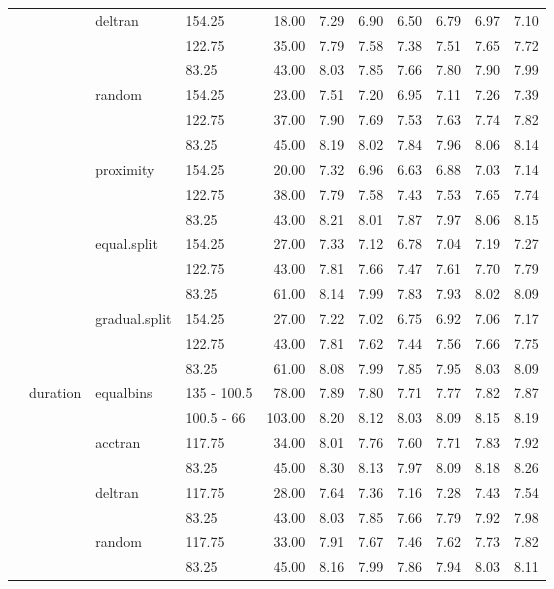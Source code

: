\begin{longtable}{llllrrrrrrr}
   &  & deltran & 154.25 & 18.00 & 7.29 & 6.90 & 6.50 & 6.79 & 6.97 & 7.10 \\ 
   &  &  & 122.75 & 35.00 & 7.79 & 7.58 & 7.38 & 7.51 & 7.65 & 7.72 \\ 
   &  &  & 83.25 & 43.00 & 8.03 & 7.85 & 7.66 & 7.80 & 7.90 & 7.99 \\ 
   &  & random & 154.25 & 23.00 & 7.51 & 7.20 & 6.95 & 7.11 & 7.26 & 7.39 \\ 
   &  &  & 122.75 & 37.00 & 7.90 & 7.69 & 7.53 & 7.63 & 7.74 & 7.82 \\ 
   &  &  & 83.25 & 45.00 & 8.19 & 8.02 & 7.84 & 7.96 & 8.06 & 8.14 \\ 
   &  & proximity & 154.25 & 20.00 & 7.32 & 6.96 & 6.63 & 6.88 & 7.03 & 7.14 \\ 
   &  &  & 122.75 & 38.00 & 7.79 & 7.58 & 7.43 & 7.53 & 7.65 & 7.74 \\ 
   &  &  & 83.25 & 43.00 & 8.21 & 8.01 & 7.87 & 7.97 & 8.06 & 8.15 \\ 
   &  & equal.split & 154.25 & 27.00 & 7.33 & 7.12 & 6.78 & 7.04 & 7.19 & 7.27 \\ 
   &  &  & 122.75 & 43.00 & 7.81 & 7.66 & 7.47 & 7.61 & 7.70 & 7.79 \\ 
   &  &  & 83.25 & 61.00 & 8.14 & 7.99 & 7.83 & 7.93 & 8.02 & 8.09 \\ 
   &  & gradual.split & 154.25 & 27.00 & 7.22 & 7.02 & 6.75 & 6.92 & 7.06 & 7.17 \\ 
   &  &  & 122.75 & 43.00 & 7.81 & 7.62 & 7.44 & 7.56 & 7.66 & 7.75 \\ 
   &  &  & 83.25 & 61.00 & 8.08 & 7.99 & 7.85 & 7.95 & 8.03 & 8.09 \\ 
   & duration & equalbins & 135 - 100.5 & 78.00 & 7.89 & 7.80 & 7.71 & 7.77 & 7.82 & 7.87 \\ 
   &  &  & 100.5 - 66 & 103.00 & 8.20 & 8.12 & 8.03 & 8.09 & 8.15 & 8.19 \\ 
   &  & acctran & 117.75 & 34.00 & 8.01 & 7.76 & 7.60 & 7.71 & 7.83 & 7.92 \\ 
   &  &  & 83.25 & 45.00 & 8.30 & 8.13 & 7.97 & 8.09 & 8.18 & 8.26 \\ 
   &  & deltran & 117.75 & 28.00 & 7.64 & 7.36 & 7.16 & 7.28 & 7.43 & 7.54 \\ 
   &  &  & 83.25 & 43.00 & 8.03 & 7.85 & 7.66 & 7.79 & 7.92 & 7.98 \\ 
   &  & random & 117.75 & 33.00 & 7.91 & 7.67 & 7.46 & 7.62 & 7.73 & 7.82 \\ 
   &  &  & 83.25 & 45.00 & 8.16 & 7.99 & 7.86 & 7.94 & 8.03 & 8.11 \\ 

\end{longtable}
